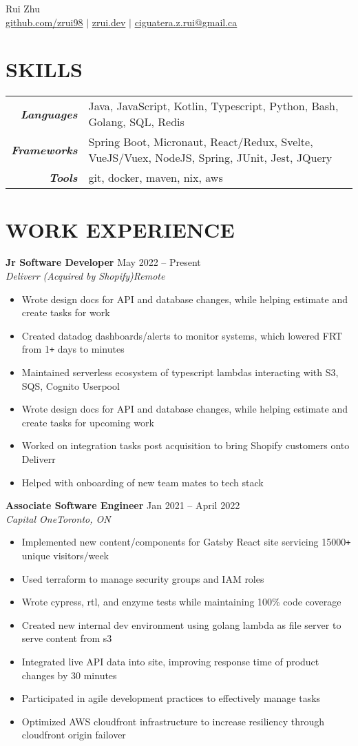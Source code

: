 \documentclass[letterpaper]{article}
\newcommand{\Header}[2]{\begin{center}
	\huge\usefont{OT1}{lmss}{m}{n}
		#1 \\
	\small{#2}
\end{center}}
\newcommand{\SplitEntry}[2]{\textbf{\textit{#1}} & \small{#2}\\}
\newcommand{\NewPart}[1]{\section*{\large\uppercase{\textbf{#1}}}}
\newcommand{\DatedEntry}[5]{\small\textbf{#1}
	\hfill \small{#2}\\
	\textit{#3}\hfill\textit{#4}\\\vspace{0.1cm}
	#5\vspace{0.1cm}
}
\begin{document}
\Header{Rui Zhu}{\url{github.com/zrui98} $|$ \url{zrui.dev} $|$ \url{ciguatera.z.rui@gmail.ca}}\vspace{-0.5cm}

\NewPart{Skills}
\begin{tabular}{r|l}
	\SplitEntry{Languages}{Java, JavaScript, Kotlin, Typescript, Python, Bash, Golang, SQL, Redis}
	\SplitEntry{Frameworks}{Spring Boot, Micronaut, React/Redux, Svelte, VueJS/Vuex, NodeJS, Spring, JUnit, Jest, JQuery}
	\SplitEntry{Tools}{git, docker, maven, nix, aws}
\end{tabular}\vspace{-0.2cm}

\NewPart{Work Experience}
\DatedEntry{Jr Software Developer}
{May 2022 -- Present}
{Deliverr (Acquired by Shopify)}
{Remote}
{\begin{itemize}[nolistsep]
	\item Wrote design docs for API and database changes, while helping estimate and create tasks for work
	\item Created datadog dashboards/alerts to monitor systems, which lowered FRT from 1\texttt{+} days to minutes
	\item Maintained serverless ecosystem of typescript lambdas interacting with S3, SQS, Cognito Userpool
	\item Wrote design docs for API and database changes, while helping estimate and create tasks for upcoming work
	\item Worked on integration tasks post acquisition to bring Shopify customers onto Deliverr
	\item Helped with onboarding of new team mates to tech stack
\end{itemize}}
\DatedEntry{Associate Software Engineer}
{Jan 2021 -- April 2022}
{Capital One}
{Toronto, ON}
{\begin{itemize}[nolistsep]
	\item Implemented new content/components for Gatsby React site servicing 15000\texttt{+} unique visitors/week
	\item Used terraform to manage security groups and IAM roles
	\item Wrote cypress, rtl, and enzyme tests while maintaining 100\% code coverage
	\item Created new internal dev environment using golang lambda as file server to serve content from s3
	\item Integrated live API data into site, improving response time of product changes by 30 minutes
	\item Participated in agile development practices to effectively manage tasks 
	\item Optimized AWS cloudfront infrastructure to increase resiliency through cloudfront origin failover
\end{itemize}}
\end{document}
